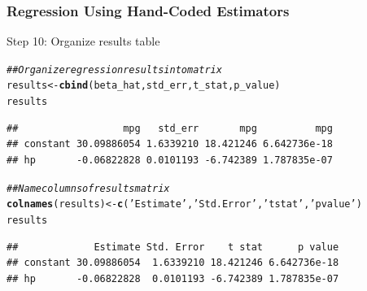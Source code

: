 \documentclass{beamer}\usepackage[]{graphicx}\usepackage[]{color}
\makeatletter
\newcommand{\hlstr}[1]{\textcolor[rgb]{0.192,0.494,0.8}{#1}}%
\newcommand{\hlcom}[1]{\textcolor[rgb]{0.678,0.584,0.686}{\textit{#1}}}%
\newcommand{\hlstd}[1]{\textcolor[rgb]{0.345,0.345,0.345}{#1}}%
\newcommand{\hlkwb}[1]{\textcolor[rgb]{0.69,0.353,0.396}{#1}}%
\newcommand{\hlkwd}[1]{\textcolor[rgb]{0.737,0.353,0.396}{\textbf{#1}}}%
\newenvironment{kframe}{%
 \def\at@end@of@kframe{}%
 \ifinner\ifhmode%
  \def\at@end@of@kframe{\end{minipage}}%
  \begin{minipage}{\columnwidth}%
 \fi\fi%
 \def\FrameCommand##1{\hskip\@totalleftmargin \hskip-\fboxsep
 \colorbox{shadecolor}{##1}\hskip-\fboxsep
     \hskip-\linewidth \hskip-\@totalleftmargin \hskip\columnwidth}%
 \MakeFramed {\advance\hsize-\width
   \@totalleftmargin\z@ \linewidth\hsize
   \@setminipage}}%
 {\par\unskip\endMakeFramed%
 \at@end@of@kframe}
\newenvironment{knitrout}{}{} %
\makeatother
\begin{document}
\begin{frame}[fragile]\frametitle{Regression Using Hand-Coded Estimators}
    Step 10: Organize results table
\begin{knitrout}\footnotesize
{}\color{fgcolor}\begin{kframe}
\begin{alltt}
\hlcom{## Organize regression results into matrix}
\hlstd{results} \hlkwb{<-} \hlkwd{cbind}\hlstd{(beta_hat, std_err, t_stat, p_value)}
\hlstd{results}
\end{alltt}
\begin{verbatim}
##                  mpg   std_err       mpg          mpg
## constant 30.09886054 1.6339210 18.421246 6.642736e-18
## hp       -0.06822828 0.0101193 -6.742389 1.787835e-07
\end{verbatim}
\begin{alltt}
\hlcom{## Name columns of results matrix}
\hlkwd{colnames}\hlstd{(results)} \hlkwb{<-} \hlkwd{c}\hlstd{(}\hlstr{'Estimate'}\hlstd{,} \hlstr{'Std. Error'}\hlstd{,} \hlstr{'t stat'}\hlstd{,} \hlstr{'p value'}\hlstd{)}
\hlstd{results}
\end{alltt}
\begin{verbatim}
##             Estimate Std. Error    t stat      p value
## constant 30.09886054  1.6339210 18.421246 6.642736e-18
## hp       -0.06822828  0.0101193 -6.742389 1.787835e-07
\end{verbatim}
\end{kframe}
\end{knitrout}
\end{frame}
\end{document}
